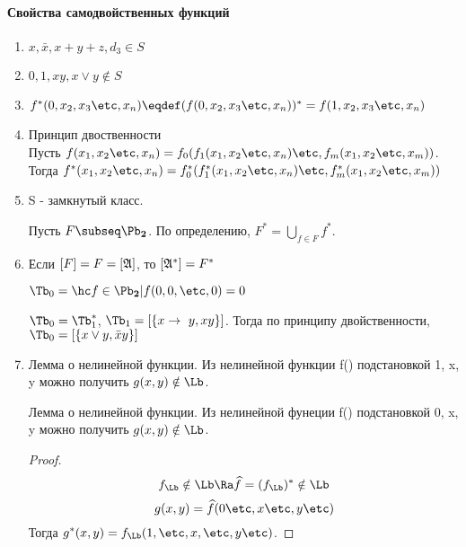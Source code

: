 \documentclass[unicode, 10pt, a4paper, oneside, fleqn]{article}
\begin{document}
\paragraph{Свойства самодвойственных функций}
\begin{enumerate}
  \item $x,\bar x, x+y+z,d_3 \in S$ 
  \item $0,1,xy,x\vee y \notin S$
  \item $f^*(0,\setf[x]{n})\eqdef (f(0,\setf[x]{n}))^*=f(1,\setf[x]{n}) $
  \item Принцип двоственности \\
    Пусть $f(\set[x]{n}) = f_0(f_1(\set[x]{n})\etc,f_m(\set[x]{m}))$.\\
    Тогда  $f^*(\set[x]{n}) = f_0^*(f_1^*(\set[x]{n})\etc,f_m^*(\set[x]{m}))$
   \item S - замкнутый класс.
     \begin{df}
       Пусть $F\subseq\PD$. По определению, $F^* = \bigcup\limits_{f\in F}{f^*}$.
     \end{df}
   \item Если $[F] = F= [\mathfrak{A}]$, то $[\mathfrak{A}^*]= F^*$
     \begin{ex}
       \begin{df}
         $\Tb_0=\setof{f\in\PD}{f(0,0,\etc,0)} = 0$
       \end{df}
       $\Tb_0= \Tb_1^*$, $\Tb_1=\cls{\impl,xy}$. Тогда по принципу двойственности,
       $\Tb_0=\cls{x\vee y, \bar xy}$%
     \end{ex}
     \item 
       \begin{lemma}{Лемма о нелинейной функции.}
       Из нелинейной функции f() подстановкой 1, x, y можно
       получить $g(x,y) \notin\Lb$.
       \end{lemma}
       \begin{lemma}{Лемма о нелинейной функции.}
         Из нелинейной фунеции f() подстановкой 0, x, y можно
         получить $g(x,y) \notin\Lb$.
       \end{lemma}
       \begin{proof}
         $$ \fL\notin\Lb \Ra \widehat f = (\fL)^*\notin \Lb$$
         $$ g(x,y) = \widehat f(0\etc,x\etc,y\etc)$$
         Тогда $\displaystyle g^*(x,y) = \fL(1,\etc,x,\etc,y\etc)$.
       \end{proof}
\end{enumerate}
\end{document}
